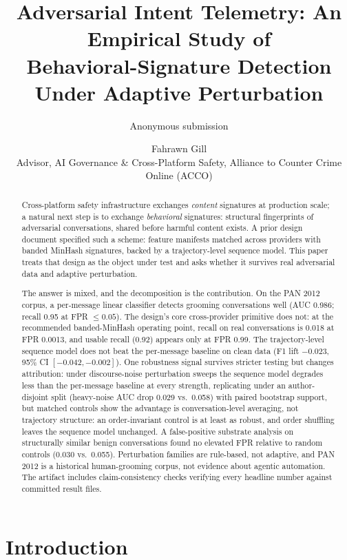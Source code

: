 \documentclass[letterpaper,twocolumn,10pt]{article}
\title{\textbf{Adversarial Intent Telemetry: An Empirical Study of\\
Behavioral-Signature Detection Under Adaptive Perturbation}}
\author{Anonymous submission}
\author{Fahrawn Gill\\ {\normalsize Advisor, AI Governance \& Cross-Platform
Safety, Alliance to Counter Crime Online (ACCO)}}
\date{}
\begin{document}
\maketitle

\begin{abstract}
Cross-platform safety infrastructure exchanges \emph{content} signatures at
production scale; a natural next step is to exchange \emph{behavioral}
signatures: structural fingerprints of adversarial conversations, shared
before harmful content exists. A prior design document specified such a
scheme: feature manifests matched across providers with banded MinHash
signatures, backed by a trajectory-level sequence model. This paper treats
that design as the object under test and asks whether it survives real
adversarial data and adaptive perturbation.

The answer is mixed, and the decomposition is the contribution. On the PAN
2012 corpus, a per-message linear classifier detects grooming conversations
well (AUC 0.986; recall 0.95 at FPR $\leq 0.05$). The design's core
cross-provider primitive does not: at the recommended banded-MinHash
operating point, recall on real conversations is 0.018 at FPR 0.0013, and
usable recall (0.92) appears only at FPR 0.99. The trajectory-level sequence
model does not beat the per-message baseline on clean data (F1 lift
$-0.023$, 95\% CI $[-0.042, -0.002]$). One robustness signal survives
stricter testing but changes attribution: under discourse-noise perturbation
sweeps the sequence model degrades less than the per-message baseline at
every strength, replicating under an author-disjoint split (heavy-noise AUC
drop 0.029 vs.\ 0.058) with paired bootstrap support, but matched controls
show the advantage is conversation-level averaging, not trajectory
structure: an order-invariant control is at least as robust, and order
shuffling leaves the sequence model unchanged. A false-positive substrate
analysis on structurally similar benign conversations found no elevated FPR
relative to random controls (0.030 vs.\ 0.055). Perturbation families are
rule-based, not adaptive, and PAN 2012 is a historical human-grooming
corpus, not evidence about agentic automation. The artifact includes
claim-consistency checks verifying every headline number against committed
result files.
\end{abstract}

\section{Introduction}
\label{sec:intro}
\end{document}
